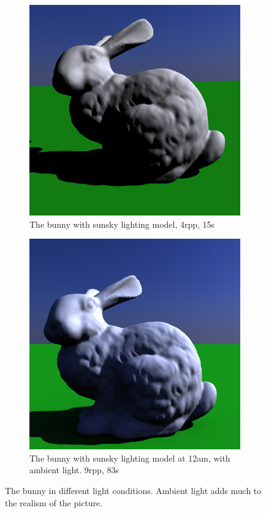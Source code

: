 \begin{figure}[h]
	\centering
	\begin{subfigure}[b]{0.5\textwidth}
		\includegraphics[width=\textwidth]{week4/bunny_4rpp_15s.png}
		\caption{The bunny with sunsky lighting model, 4rpp, 15s}
		\label{fig:bunnydirect}
	\end{subfigure}
	\begin{subfigure}[b]{0.5\textwidth}
		\includegraphics[width=\textwidth]{week4/bunny_ambient_9rpp_83s_12.png}
		\caption{The bunny with sunsky lighting model at 12am, with ambient light. 9rpp, 83s}
	\end{subfigure}
	\caption{The bunny in different light conditions. Ambient light adds much to the realism of the picture.}
	\label{fig:comparedirectambient}
 \end{figure}
 
